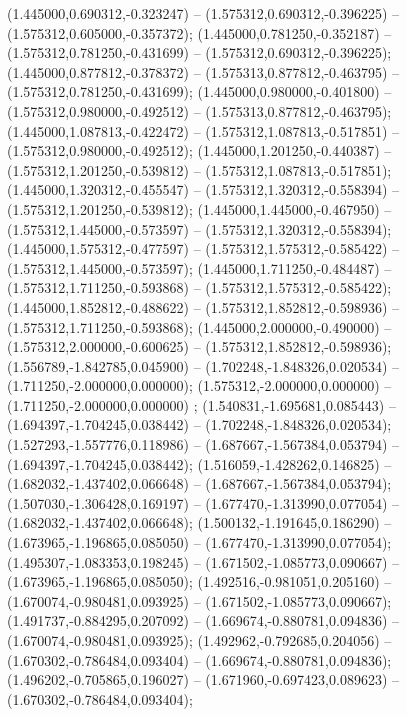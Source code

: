  (1.445000,0.690312,-0.323247) -- (1.575312,0.690312,-0.396225) -- (1.575312,0.605000,-0.357372);
 (1.445000,0.781250,-0.352187) -- (1.575312,0.781250,-0.431699) -- (1.575312,0.690312,-0.396225);
 (1.445000,0.877812,-0.378372) -- (1.575313,0.877812,-0.463795) -- (1.575312,0.781250,-0.431699);
 (1.445000,0.980000,-0.401800) -- (1.575312,0.980000,-0.492512) -- (1.575313,0.877812,-0.463795);
 (1.445000,1.087813,-0.422472) -- (1.575312,1.087813,-0.517851) -- (1.575312,0.980000,-0.492512);
 (1.445000,1.201250,-0.440387) -- (1.575312,1.201250,-0.539812) -- (1.575312,1.087813,-0.517851);
 (1.445000,1.320312,-0.455547) -- (1.575312,1.320312,-0.558394) -- (1.575312,1.201250,-0.539812);
 (1.445000,1.445000,-0.467950) -- (1.575312,1.445000,-0.573597) -- (1.575312,1.320312,-0.558394);
 (1.445000,1.575312,-0.477597) -- (1.575312,1.575312,-0.585422) -- (1.575312,1.445000,-0.573597);
 (1.445000,1.711250,-0.484487) -- (1.575312,1.711250,-0.593868) -- (1.575312,1.575312,-0.585422);
 (1.445000,1.852812,-0.488622) -- (1.575312,1.852812,-0.598936) -- (1.575312,1.711250,-0.593868);
 (1.445000,2.000000,-0.490000) -- (1.575312,2.000000,-0.600625) -- (1.575312,1.852812,-0.598936);
 (1.556789,-1.842785,0.045900) -- (1.702248,-1.848326,0.020534) -- (1.711250,-2.000000,0.000000);
 (1.575312,-2.000000,0.000000) -- (1.711250,-2.000000,0.000000) ;
 (1.540831,-1.695681,0.085443) -- (1.694397,-1.704245,0.038442) -- (1.702248,-1.848326,0.020534);
 (1.527293,-1.557776,0.118986) -- (1.687667,-1.567384,0.053794) -- (1.694397,-1.704245,0.038442);
 (1.516059,-1.428262,0.146825) -- (1.682032,-1.437402,0.066648) -- (1.687667,-1.567384,0.053794);
 (1.507030,-1.306428,0.169197) -- (1.677470,-1.313990,0.077054) -- (1.682032,-1.437402,0.066648);
 (1.500132,-1.191645,0.186290) -- (1.673965,-1.196865,0.085050) -- (1.677470,-1.313990,0.077054);
 (1.495307,-1.083353,0.198245) -- (1.671502,-1.085773,0.090667) -- (1.673965,-1.196865,0.085050);
 (1.492516,-0.981051,0.205160) -- (1.670074,-0.980481,0.093925) -- (1.671502,-1.085773,0.090667);
 (1.491737,-0.884295,0.207092) -- (1.669674,-0.880781,0.094836) -- (1.670074,-0.980481,0.093925);
 (1.492962,-0.792685,0.204056) -- (1.670302,-0.786484,0.093404) -- (1.669674,-0.880781,0.094836);
 (1.496202,-0.705865,0.196027) -- (1.671960,-0.697423,0.089623) -- (1.670302,-0.786484,0.093404);
